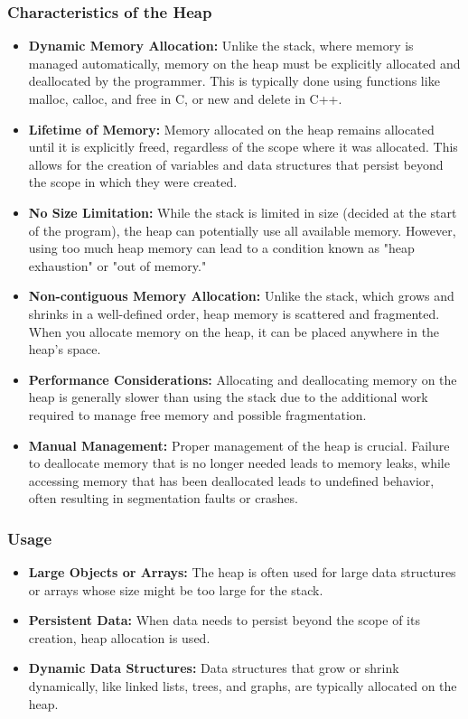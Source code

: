 \documentclass{report}
\begin{document}
\begin{concept}
    \subsubsection{Characteristics of the Heap}
    \begin{itemize}
        \item \textbf{Dynamic Memory Allocation:} Unlike the stack, where memory is managed automatically, memory on the heap must be explicitly allocated and deallocated by the programmer. This is typically done using functions like malloc, calloc, and free in C, or new and delete in C++.
        \item \textbf{Lifetime of Memory:} Memory allocated on the heap remains allocated until it is explicitly freed, regardless of the scope where it was allocated. This allows for the creation of variables and data structures that persist beyond the scope in which they were created.
        \item \textbf{No Size Limitation:} While the stack is limited in size (decided at the start of the program), the heap can potentially use all available memory. However, using too much heap memory can lead to a condition known as "heap exhaustion" or "out of memory."
        \item \textbf{Non-contiguous Memory Allocation:} Unlike the stack, which grows and shrinks in a well-defined order, heap memory is scattered and fragmented. When you allocate memory on the heap, it can be placed anywhere in the heap's space.
        \item \textbf{Performance Considerations:} Allocating and deallocating memory on the heap is generally slower than using the stack due to the additional work required to manage free memory and possible fragmentation.
        \item \textbf{Manual Management:} Proper management of the heap is crucial. Failure to deallocate memory that is no longer needed leads to memory leaks, while accessing memory that has been deallocated leads to undefined behavior, often resulting in segmentation faults or crashes.
    \end{itemize}

    \bigbreak \noindent 
    \subsubsection{Usage}
    \begin{itemize}
        \item \textbf{Large Objects or Arrays:} The heap is often used for large data structures or arrays whose size might be too large for the stack.
        \item \textbf{Persistent Data:} When data needs to persist beyond the scope of its creation, heap allocation is used.
        \item \textbf{Dynamic Data Structures:} Data structures that grow or shrink dynamically, like linked lists, trees, and graphs, are typically allocated on the heap.
    \end{itemize}


\end{concept}
\end{document}
